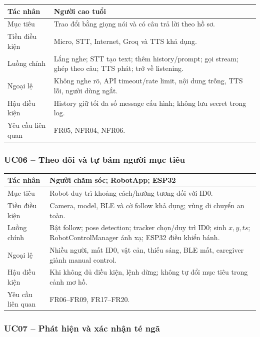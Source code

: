 \begin{longtable}{|p{3.3cm}|p{10.1cm}|}
\hline
Tác nhân & Người cao tuổi \\
\hline
Mục tiêu & Trao đổi bằng giọng nói và có câu trả lời theo hồ sơ. \\
\hline
Tiền điều kiện & Micro, STT, Internet, Groq và TTS khả dụng. \\
\hline
Luồng chính & Lắng nghe; STT tạo text; thêm history/prompt; gọi stream; ghép theo câu; TTS phát; trở về listening. \\
\hline
Ngoại lệ & Không nghe rõ, API timeout/rate limit, nội dung trống, TTS lỗi, người dùng ngắt. \\
\hline
Hậu điều kiện & History giữ tối đa số message cấu hình; không lưu secret trong log. \\
\hline
Yêu cầu liên quan & FR05, NFR04, NFR06. \\
\hline
\end{longtable}

\subsubsection*{UC06 -- Theo dõi và tự bám người mục tiêu}

\begin{longtable}{|p{3.3cm}|p{10.1cm}|}
\hline
Tác nhân & Người chăm sóc; RobotApp; ESP32 \\
\hline
Mục tiêu & Robot duy trì khoảng cách/hướng tương đối với ID0. \\
\hline
Tiền điều kiện & Camera, model, BLE và cờ follow khả dụng; vùng di chuyển an toàn. \\
\hline
Luồng chính & Bật follow; pose detection; tracker chọn/duy trì ID0; sinh $x,y,ts$; RobotControlManager ánh xạ; ESP32 điều khiển bánh. \\
\hline
Ngoại lệ & Nhiều người, mất ID0, vật cản, thiếu sáng, BLE mất, caregiver giành manual control. \\
\hline
Hậu điều kiện & Khi không đủ điều kiện, lệnh dừng; không tự đổi mục tiêu trong cảnh mơ hồ. \\
\hline
Yêu cầu liên quan & FR06--FR09, FR17--FR20. \\
\hline
\end{longtable}

\subsubsection*{UC07 -- Phát hiện và xác nhận té ngã}

